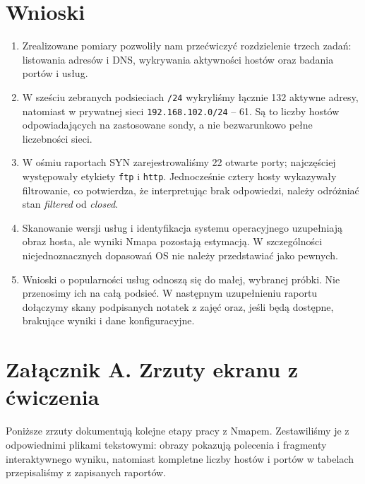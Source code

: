 \documentclass[11pt,a4paper]{article}
\begin{document}
\section{Wnioski}
\begin{enumerate}
  \item Zrealizowane pomiary pozwoliły nam przećwiczyć rozdzielenie trzech zadań:
        listowania adresów i DNS, wykrywania aktywności hostów oraz badania
        portów i usług.
  \item W sześciu zebranych podsieciach \texttt{/24} wykryliśmy łącznie 132
        aktywne adresy, natomiast w prywatnej sieci \texttt{192.168.102.0/24}
        -- 61. Są to liczby hostów odpowiadających na zastosowane sondy, a nie
        bezwarunkowo pełne liczebności sieci.
  \item W ośmiu raportach SYN zarejestrowaliśmy 22 otwarte porty; najczęściej
        występowały etykiety \texttt{ftp} i \texttt{http}. Jednocześnie cztery
        hosty wykazywały filtrowanie, co potwierdza, że interpretując brak
        odpowiedzi, należy odróżniać stan \textit{filtered} od
        \textit{closed}.
  \item Skanowanie wersji usług i identyfikacja systemu operacyjnego uzupełniają
        obraz hosta, ale wyniki Nmapa pozostają estymacją. W szczególności
        niejednoznacznych dopasowań OS nie należy przedstawiać jako pewnych.
  \item Wnioski o popularności usług odnoszą się do małej, wybranej próbki.
        Nie przenosimy ich na całą podsieć. W następnym uzupełnieniu raportu
        dołączymy skany podpisanych notatek z zajęć oraz, jeśli będą dostępne,
        brakujące wyniki i dane konfiguracyjne.
\end{enumerate}

\clearpage
\section*{Załącznik A. Zrzuty ekranu z ćwiczenia}
Poniższe zrzuty dokumentują kolejne etapy pracy z Nmapem. Zestawiliśmy je
z odpowiednimi plikami tekstowymi: obrazy pokazują polecenia i fragmenty
interaktywnego wyniku, natomiast kompletne liczby hostów i portów w tabelach
przepisaliśmy z zapisanych raportów.
\end{document}
